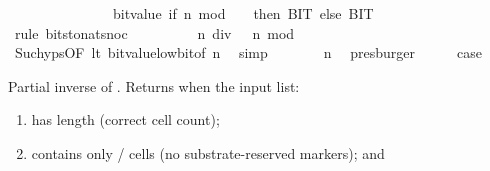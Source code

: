 \begin{isabellebody}
\ \ \ \ \ \ \ \ \ \ \ \ \ \ {\isacharplus}{\kern0pt}\ bit{\isacharunderscore}{\kern0pt}value\ {\isacharparenleft}{\kern0pt}if\ n\ mod\ {}\ {\isacharequal}{\kern0pt}\ {}\ then\ BIT{}\ else\ BIT{}{\isacharparenright}{\kern0pt}{\isachardoublequoteclose}\isanewline
\ \ \ \ \isamarkupfalse%
\ {\isacharparenleft}{\kern0pt}rule\ bits{\isacharunderscore}{\kern0pt}to{\isacharunderscore}{\kern0pt}nat{\isacharunderscore}{\kern0pt}snoc{\isacharparenright}{\kern0pt}\isanewline
\ \ \isamarkupfalse%
\ \isamarkupfalse%
\ {\isachardoublequoteopen}{\isasymdots}\ {\isacharequal}{\kern0pt}\ {}\ {\isacharasterisk}{\kern0pt}\ {\isacharparenleft}{\kern0pt}n\ div\ {}{\isacharparenright}{\kern0pt}\ {\isacharplus}{\kern0pt}\ {\isacharparenleft}{\kern0pt}n\ mod\ {}{\isacharparenright}{\kern0pt}{\isachardoublequoteclose}\isanewline
\ \ \ \ \isamarkupfalse%
\ Suc{\isachardot}{\kern0pt}hyps{\isacharbrackleft}{\kern0pt}OF\ lt{\isacharbrackright}{\kern0pt}\ bit{\isacharunderscore}{\kern0pt}value{\isacharunderscore}{\kern0pt}low{\isacharunderscore}{\kern0pt}bit{\isacharbrackleft}{\kern0pt}of\ n{\isacharbrackright}{\kern0pt}\ \isamarkupfalse%
\ simp\isanewline
\ \ \isamarkupfalse%
\ \isamarkupfalse%
\ {\isachardoublequoteopen}{\isasymdots}\ {\isacharequal}{\kern0pt}\ n{\isachardoublequoteclose}\ \isamarkupfalse%
\ presburger\isanewline
\ \ \isamarkupfalse%
\ \isamarkupfalse%
\ {\isacharquery}{\kern0pt}case\ \isakeywordONE{{\isachardot}{\kern0pt}}\isamarkupfalse%
\isanewline
{}\isamarkupfalse%
%
\endisatagproof
{\isafoldproof}%
%
\isadelimproof
%
\endisadelimproof
%
\isadelimdocument
%
\endisadelimdocument
%
\isatagdocument
%
\isamarkuptrue%
%
\endisatagdocument
{\isafolddocument}%
%
\isadelimdocument
%
\endisadelimdocument
%
\begin{isamarkuptext}%
Partial inverse of .  Returns
 when the input list:

%
\begin{enumerate}%
\item has length  (correct cell count);

\item contains only  /  cells (no
substrate-reserved markers); and


\end{enumerate}
\end{isamarkuptext}
\end{isabellebody}
